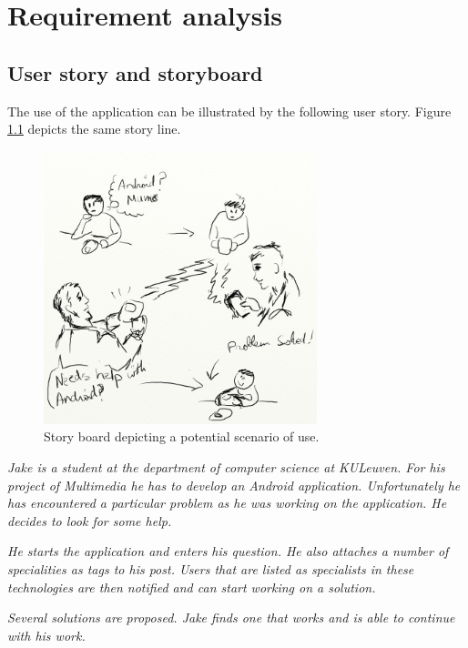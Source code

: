 \chapter{Requirement analysis}\label{chapter:requirement_analysis}

\section{User story and storyboard}\label{section:story}

The use of the application can be illustrated by the following  user story. Figure \ref{figure:storyboard} depicts the same story line.

\begin{figure}
	\begin{center}
		\includegraphics[width=300px]{img/storyboard}
		\caption{Story board depicting a potential scenario of use.}
		\label{figure:storyboard}
\end{center}

\end{figure}


\textit{Jake is a student at the department of computer science at KULeuven. For his project of Multimedia he has to develop an Android application. Unfortunately he has encountered a particular problem as he was working on the application. He decides to look for some help.}

\textit{He starts the application and enters his question. He also attaches a number of specialities as tags to his post. Users that are listed as specialists in these technologies are then notified and can start working on a solution.}

\textit{Several solutions are proposed. Jake finds one that works and is able to continue with his work.}


